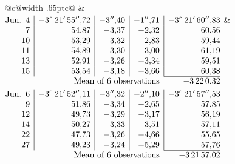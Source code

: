 \noindent\begin{tabular}{@{}c@{\hspace{.4em}\vrule width .65pt\hspace{.4em}}c@{}}
 &
 \\[.18ex]
\(\begin{array}[t]{@{}r|r|r|r|r@{}}
\text{Jun.}\enspace 4 & -3^\circ\,21'\,55''{,}72 & -3''{,}40 & -1''{,}71 & -3^\circ\,21'\,60''{,}83\\
7 & 54{,}87 & -3{,}37 & -2{,}32 & 60{,}56\\
10 & 53{,}29 & -3{,}32 & -2{,}83 & 59{,}44\\
11 & 54{,}89 & -3{,}30 & -3{,}00 & 61{,}19\\
13 & 52{,}91 & -3{,}26 & -3{,}34 & 59{,}51\\
15 & 53{,}54 & -3{,}18 & -3{,}66 & 60{,}38\\
\cline{5-5}
\multicolumn{4}{r}{\text{Mean of 6 observations}} & -3\,22\,0{,}32
\end{array}\)
&
\(\begin{array}[t]{@{}r|r|r|r|r@{}}
\text{Jun.}\enspace 6 & -3^\circ\,21'\,52''{,}11 & -3''{,}32 & -2''{,}10 & -3^\circ\,21'\,57''{,}53\\
9 & 51{,}86 & -3{,}34 & -2{,}65 & 57{,}85\\
12 & 49{,}73 & -3{,}29 & -3{,}17 & 56{,}19\\
14 & 50{,}27 & -3{,}33 & -3{,}51 & 57{,}11\\
22 & 47{,}73 & -3{,}26 & -4{,}66 & 55{,}65\\
27 & 49{,}23 & -3{,}24 & -5{,}29 & 57{,}76\\
\cline{5-5}
\multicolumn{4}{r}{\text{Mean of 6 observations}} & -3\,21\,57{,}02
\end{array}\)
\end{tabular}\par\medskip
{}
